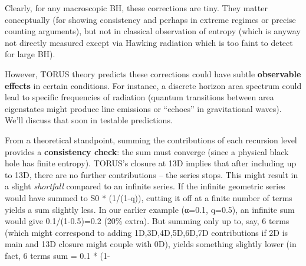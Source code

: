 \documentclass[]{article}
\begin{document}
Clearly, for any macroscopic BH, these corrections are tiny. They matter
conceptually (for showing consistency and perhaps in extreme regimes or
precise counting arguments), but not in classical observation of entropy
(which is anyway not directly measured except via Hawking radiation
which is too faint to detect for large BH).

However, TORUS theory predicts these corrections could have subtle
\textbf{observable effects} in certain conditions. For instance, a
discrete horizon area spectrum could lead to specific frequencies of
radiation (quantum transitions between area eigenstates might produce
line emissions or ``echoes'' in gravitational waves). We'll discuss that
soon in testable predictions.

From a theoretical standpoint, summing the contributions of each
recursion level provides a \textbf{consistency check}: the sum must
converge (since a physical black hole has finite entropy). TORUS's
closure at 13D implies that after including up to 13D, there are no
further contributions -- the series stops. This might result in a slight
\emph{shortfall} compared to an infinite series. If the infinite
geometric series would have summed to S0 * (1/(1-q)), cutting it off at
a finite number of terms yields a sum slightly less. In our earlier
example (α=0.1, q=0.5), an infinite sum would give 0.1/(1-0.5)=0.2 (20\%
extra). But summing only up to, say, 6 terms (which might correspond to
adding 1D,3D,4D,5D,6D,7D contributions if 2D is main and 13D closure
might couple with 0D), yields something slightly lower (in fact, 6 terms
sum = 0.1 * (1-
\end{document}
